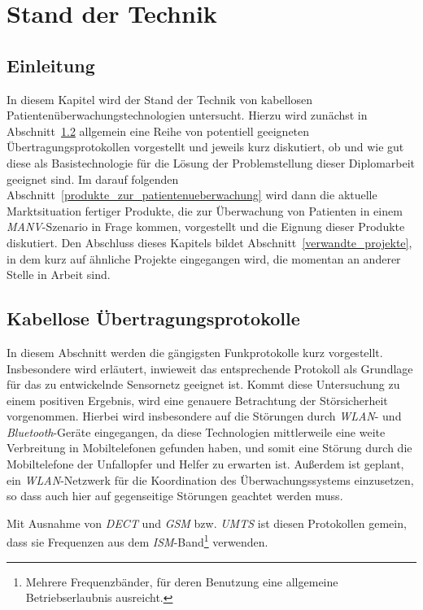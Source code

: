 
\chapter{Stand der Technik}\label{Stand der Technik}

\section{Einleitung}
In diesem Kapitel wird der Stand der Technik von kabellosen Patientenüberwachungstechnologien untersucht. 
Hierzu wird zunächst in Abschnitt~\ref{kabellose_uebertragungsprotokolle} allgemein eine Reihe von potentiell
geeigneten Übertragungsprotokollen vorgestellt und jeweils kurz diskutiert, ob und wie gut diese als 
Basistechnologie für die Lösung der Problemstellung dieser Diplomarbeit geeignet sind. Im darauf folgenden
Abschnitt~\ref{produkte_zur_patientenueberwachung} wird dann die aktuelle Marktsituation fertiger Produkte,
die zur Überwachung von Patienten in einem \emph{MANV}-Szenario in Frage kommen, vorgestellt und die Eignung dieser
Produkte diskutiert. Den Abschluss dieses Kapitels bildet Abschnitt~\ref{verwandte_projekte}, in dem
kurz auf ähnliche Projekte eingegangen wird, die momentan an anderer Stelle in Arbeit sind.

\section{Kabellose Übertragungsprotokolle}\label{kabellose_uebertragungsprotokolle}
        In diesem Abschnitt werden die gängigsten Funkprotokolle kurz vorgestellt. Insbesondere wird erläutert,
        inwieweit das entsprechende Protokoll als Grundlage für das zu entwickelnde Sensornetz geeignet ist.
        Kommt diese Untersuchung zu einem positiven Ergebnis, wird eine genauere Betrachtung der Störsicherheit
        vorgenommen. Hierbei wird insbesondere auf die Störungen durch \emph{WLAN}- und \emph{Bluetooth}-Geräte
        eingegangen, da diese Technologien mittlerweile eine weite Verbreitung in Mobiltelefonen gefunden
        haben, und somit eine Störung durch die Mobiltelefone der Unfallopfer und Helfer zu erwarten ist. Außerdem
        ist geplant, ein \emph{WLAN}-Netzwerk für die Koordination des Überwachungssystems einzusetzen, so dass
        auch hier auf gegenseitige Störungen geachtet werden muss.

        Mit Ausnahme von \emph{DECT} und \emph{GSM} bzw. \emph{UMTS} ist diesen Protokollen gemein, dass 
        sie Frequenzen aus dem \emph{ISM}-Band\footnote{Mehrere Frequenzbänder, für deren Benutzung eine allgemeine 
            Betriebserlaubnis ausreicht.} verwenden. 

